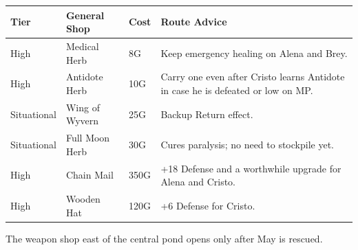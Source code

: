 \documentclass[
  american,
  10pt,
  letterpaper,
  oneside,
  open=any]{scrreprt}
\newcounter{none} %
\newenvironment{guidetable}{%
  \small\setstretch{1.0}%
  \setlength{\tabcolsep}{4pt}%
  \setlength{\LTpre}{8pt}\setlength{\LTpost}{10pt}%
  \renewcommand{\arraystretch}{1.16}%
}{ }
\begin{document}
\begin{guidetable}

{\def\LTcaptype{none} %
\begin{longtable}[]{@{}
  >{\raggedright\arraybackslash}p{}
  >{\raggedright\arraybackslash}p{}
  >{\raggedleft\arraybackslash}p{}
  >{\raggedright\arraybackslash}p{}@{}}
\toprule\noalign{}
\begin{minipage}[b]{\linewidth}\raggedright
\color{GuideGreen}\bfseries Tier
\end{minipage} & \begin{minipage}[b]{\linewidth}\raggedright
\color{GuideGreen}\bfseries General Shop
\end{minipage} & \begin{minipage}[b]{\linewidth}\raggedleft
\color{GuideGreen}\bfseries Cost
\end{minipage} & \begin{minipage}[b]{\linewidth}\raggedright
\color{GuideGreen}\bfseries Route Advice
\end{minipage} \\
\midrule\noalign{}
\endhead
\bottomrule\noalign{}
\endlastfoot
High & Medical Herb & 8G & Keep emergency healing on Alena and Brey. \\
High & Antidote Herb & 10G & Carry one even after Cristo learns Antidote
in case he is defeated or low on MP. \\
Situational & Wing of Wyvern & 25G & Backup Return effect. \\
Situational & Full Moon Herb & 30G & Cures paralysis; no need to
stockpile yet. \\
High & Chain Mail & 350G & +18 Defense and a worthwhile upgrade for
Alena and Cristo. \\
High & Wooden Hat & 120G & +6 Defense for Cristo. \\
\end{longtable}
}

\end{guidetable}

The weapon shop east of the central pond opens only after May is
rescued.
\end{document}
